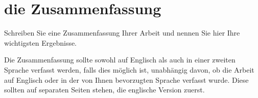 \section*{die Zusammenfassung}


Schreiben Sie eine Zusammenfassung Ihrer Arbeit und nennen Sie hier Ihre wichtigsten Ergebnisse.

Die Zusammenfassung sollte sowohl auf Englisch als auch in einer zweiten Sprache verfasst werden, falls dies möglich ist, unabhängig davon, ob die Arbeit auf Englisch oder in der von Ihnen bevorzugten Sprache verfasst wurde. Diese sollten auf separaten Seiten stehen, die englische Version zuerst.